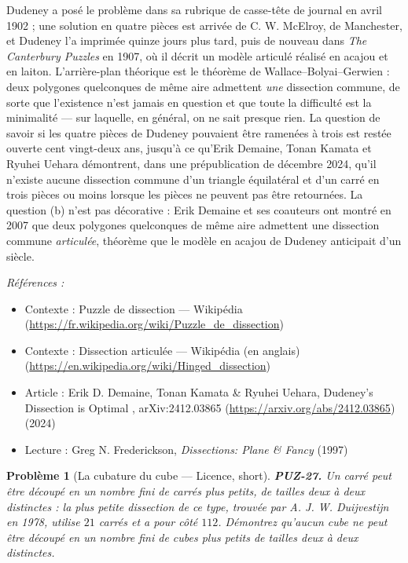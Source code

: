 \documentclass[11pt]{article}
\newtheorem{problem}{Problème}
\newenvironment{refs}{\par\small\noindent\emph{Références :}\begin{itemize}\setlength\itemsep{0pt}}{\end{itemize}\normalsize}
\begin{document}
\noindent Dudeney a posé le problème dans sa rubrique de casse-tête de journal en avril 1902 ; une solution en quatre pièces est arrivée de C. W. McElroy, de Manchester, et Dudeney l'a imprimée quinze jours plus tard, puis de nouveau dans \textit{The Canterbury Puzzles} en 1907, où il décrit un modèle articulé réalisé en acajou et en laiton. L'arrière-plan théorique est le théorème de Wallace--Bolyai--Gerwien : deux polygones quelconques de même aire admettent \textit{une} dissection commune, de sorte que l'existence n'est jamais en question et que toute la difficulté est la minimalité --- sur laquelle, en général, on ne sait presque rien. La question de savoir si les quatre pièces de Dudeney pouvaient être ramenées à trois est restée ouverte cent vingt-deux ans, jusqu'à ce qu'Erik Demaine, Tonan Kamata et Ryuhei Uehara démontrent, dans une prépublication de décembre 2024, qu'il n'existe aucune dissection commune d'un triangle équilatéral et d'un carré en trois pièces ou moins lorsque les pièces ne peuvent pas être retournées. La question (b) n'est pas décorative : Erik Demaine et ses coauteurs ont montré en 2007 que deux polygones quelconques de même aire admettent une dissection commune \textit{articulée}, théorème que le modèle en acajou de Dudeney anticipait d'un siècle.

\begin{refs}
\item Contexte : Puzzle de dissection --- Wikipédia (\url{https://fr.wikipedia.org/wiki/Puzzle_de_dissection})
\item Contexte : Dissection articulée --- Wikipédia (en anglais) (\url{https://en.wikipedia.org/wiki/Hinged_dissection})
\item Article : Erik D. Demaine, Tonan Kamata \& Ryuhei Uehara, \og{} Dudeney's Dissection is Optimal \fg{}, arXiv:2412.03865 (\url{https://arxiv.org/abs/2412.03865}) (2024)
\item Lecture : Greg N. Frederickson, \textit{Dissections: Plane \& Fancy} (1997)
\end{refs}

\bigskip

\begin{problem}[{La cubature du cube --- Licence, short}]
\textbf{PUZ-27.} Un carré peut être découpé en un nombre fini de carrés plus petits, de tailles deux à deux distinctes : la plus petite dissection de ce type, trouvée par A. J. W. Duijvestijn en 1978, utilise $ 21 $ carrés et a pour côté $ 112 $. Démontrez qu'aucun cube ne peut être découpé en un nombre fini de cubes plus petits de tailles deux à deux distinctes.
\end{problem}
\end{document}
